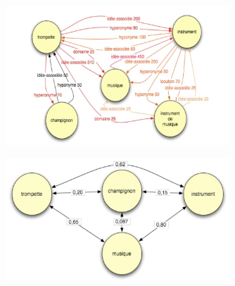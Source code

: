 \documentclass{beamer}
\begin{document}
\begin{frame}
\begin{figure}
 \begin{minipage}{\textwidth}
\centering 
       \includegraphics[width=0.75\textwidth]{img/jdm.jpeg}
    \end{minipage}
\end{figure}
\end{frame}


\begin{frame}
\begin{figure}
 \begin{minipage}{\textwidth}
\centering 
       \includegraphics[width=0.75\textwidth]{img/lsa.jpeg}
  \end{minipage}
\end{figure}
\end{frame}
\end{document}
